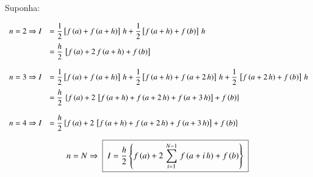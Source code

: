 Suponha:

\[
 \begin{array}{ll}
  n = 2 \Rightarrow I & = \displaystyle \frac{1}{2} \left[ f\,(a) + f\,(a + h) \right] \, h + \frac{1}{2} \left[ f\,(a + h) + f\,(b) \right] \, h \vspace*{0.2cm} \\
                      & = \displaystyle \frac{h}{2} \, \left[ f\,(a) + 2\,f\,(a + h) + f\,(b) \right] \\
  \\
  n = 3 \Rightarrow I & = \displaystyle \frac{1}{2} \left[ f\,(a) + f\,(a + h) \right] \, h + \frac{1}{2} \left[ f\,(a + h) + f\,(a + 2\,h) \right] \, h + \frac{1}{2} \, \left[ f\,(a + 2\,h) + f\,(b) \right] \, h \vspace*{0.2cm} \\
                      & = \displaystyle \frac{h}{2} \, \left\{ f\,(a) + 2\,\left[ f\,(a + h) + f\,(a + 2\,h) + f\,(a + 3\,h) \right] + f\,(b) \right\} \\
  \\
  n = 4 \Rightarrow I & = \displaystyle \frac{h}{2} \left\{ f\,(a) + 2\,\left[ f\,(a + h) + f\,(a + 2\,h) + f\,(a + 3\,h) \right] + f\,(b) \right\}
 \end{array}
\]

\begin{equation}
 \begin{array}{l}
  n = N \Rightarrow \mbox{ \framebox{ $ I = \displaystyle \frac{h}{2} \left\{ f\,(a) + 2\,\sum_{i=1}^{N-1} \, f\,(a + i\,h) + f\,(b) \right\} $ } }
 \end{array}
\end{equation}

